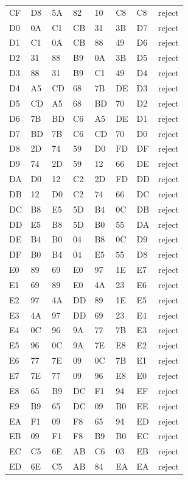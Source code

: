 \begin{longtable}{llllllll}
CF & D8 & 5A & 82 & 10 & C8 & C8 & reject\\
D0 & 0A & C1 & CB & 31 & 3B & D7 & reject\\
D1 & C1 & 0A & CB & 88 & 49 & D6 & reject\\
D2 & 31 & 88 & B9 & 0A & 3B & D5 & reject\\
D3 & 88 & 31 & B9 & C1 & 49 & D4 & reject\\
D4 & A5 & CD & 68 & 7B & DE & D3 & reject\\
D5 & CD & A5 & 68 & BD & 70 & D2 & reject\\
D6 & 7B & BD & C6 & A5 & DE & D1 & reject\\
D7 & BD & 7B & C6 & CD & 70 & D0 & reject\\
D8 & 2D & 74 & 59 & D0 & FD & DF & reject\\
D9 & 74 & 2D & 59 & 12 & 66 & DE & reject\\
DA & D0 & 12 & C2 & 2D & FD & DD & reject\\
DB & 12 & D0 & C2 & 74 & 66 & DC & reject\\
DC & B8 & E5 & 5D & B4 & 0C & DB & reject\\
DD & E5 & B8 & 5D & B0 & 55 & DA & reject\\
DE & B4 & B0 & 04 & B8 & 0C & D9 & reject\\
DF & B0 & B4 & 04 & E5 & 55 & D8 & reject\\
E0 & 89 & 69 & E0 & 97 & 1E & E7 & reject\\
E1 & 69 & 89 & E0 & 4A & 23 & E6 & reject\\
E2 & 97 & 4A & DD & 89 & 1E & E5 & reject\\
E3 & 4A & 97 & DD & 69 & 23 & E4 & reject\\
E4 & 0C & 96 & 9A & 77 & 7B & E3 & reject\\
E5 & 96 & 0C & 9A & 7E & E8 & E2 & reject\\
E6 & 77 & 7E & 09 & 0C & 7B & E1 & reject\\
E7 & 7E & 77 & 09 & 96 & E8 & E0 & reject\\
E8 & 65 & B9 & DC & F1 & 94 & EF & reject\\
E9 & B9 & 65 & DC & 09 & B0 & EE & reject\\
EA & F1 & 09 & F8 & 65 & 94 & ED & reject\\
EB & 09 & F1 & F8 & B9 & B0 & EC & reject\\
EC & C5 & 6E & AB & C6 & 03 & EB & reject\\
ED & 6E & C5 & AB & 84 & EA & EA & reject\\

\end{longtable}
